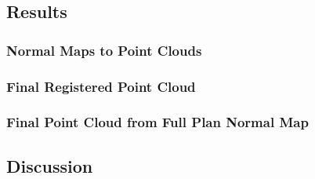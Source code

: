 \subsection{Results}
\label{sec:ResultsPtClouds}

	\subsubsection{Normal Maps to Point Clouds}
	\label{sec:Normal2PtsResults}
	
	\subsubsection{Final Registered Point Cloud}
	\label{sec:RegisteredPointCloud}
	
	\subsubsection{Final Point Cloud from Full Plan Normal Map}
	\label{sec:IntegratedPointCloud}


\subsection{Discussion}
\label{sec:DiscussionPtClouds}
